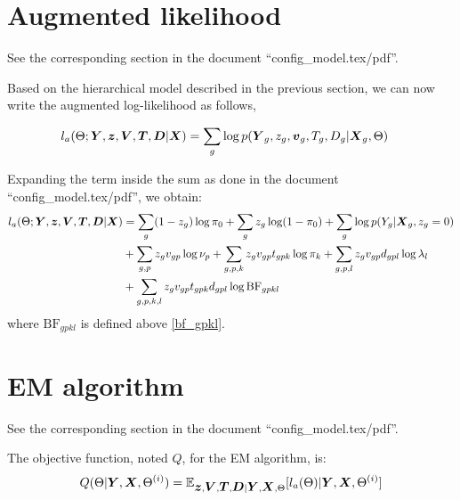 \documentclass[10pt]{article}
\newcommand{\Exp}{\mathbb{E}} %
\newcommand{\BF}{{\text{BF}}} %
\newcommand{\Dv}{\mbox{\boldmath$D$}}
\newcommand{\vv}{\mbox{\boldmath$v$}}
\newcommand{\Tv}{\mbox{\boldmath$T$}}
\newcommand{\Xv}{\mbox{\boldmath$X$}}
\newcommand{\Vv}{\mbox{\boldmath$V$}}
\newcommand{\Yv}{\mbox{\boldmath$Y$}}
\newcommand{\zv}{\mbox{\boldmath$z$}}
\begin{document}
\section{Augmented likelihood}

See the corresponding section in the document ``config\_model.tex/pdf''.

Based on the hierarchical model described in the previous section, we can now write the augmented log-likelihood as follows,

\begin{equation}
  \begin{aligned}
    l_a(\Theta;\Yv,\zv,\Vv,\Tv,\Dv|\Xv) &= \sum_g \log p(\Yv_g,z_g,\vv_g,T_g,D_g | \Xv_g,\Theta)
  \end{aligned}
\end{equation}

Expanding the term inside the sum as done in the document ``config\_model.tex/pdf'', we obtain:
\begin{equation}
 \label{laug}  
  \begin{aligned}
    l_a(\Theta;\Yv,\zv,\Vv,\Tv,\Dv|\Xv) &= \sum_g (1-z_g)\log \pi_0 + \sum_g z_g \log (1-\pi_0) + \sum_g \log p(Y_g|\Xv_g,z_g=0) \\
    &+ \sum_{g,p} z_gv_{gp}\log \nu_p + \sum_{g,p,k} z_g v_{gp} t_{gpk} \log \pi_k + \sum_{g,p,l} z_g v_{gp} d_{gpl} \log \lambda_l \\
    &+ \sum_{g,p,k,l} z_g v_{gp} t_{gpk} d_{gpl} \log \BF_{gpkl}
  \end{aligned}
\end{equation}
where $\BF_{gpkl}$ is defined above \eqref{bf_gpkl}.



\section{EM algorithm}

See the corresponding section in the document ``config\_model.tex/pdf''.

The objective function, noted $Q$, for the EM algorithm, is:
\begin{equation}
  \label{Q}
  \begin{aligned}
    Q(\Theta|\Yv,\Xv,\Theta^{(i)}) = \Exp_{\zv,\Vv,\Tv,\Dv | \Yv,\Xv,\Theta} [ l_a(\Theta) | \Yv,\Xv,\Theta^{(i)} ]
  \end{aligned}
\end{equation}
\end{document}
